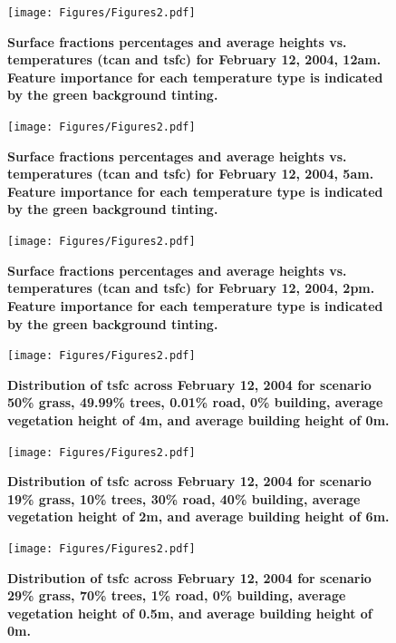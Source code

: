 \documentclass[final,3p,times,authoryear]{elsarticle}
\begin{document}
\begin{figure}
\centering
\texttt{[image: Figures/Figures2.pdf]}
\caption{\bf Surface fractions percentages and average heights vs. temperatures (\gls{tcan} and \gls{tsfc}) for February 12, 2004, 12am. Feature importance for each temperature type is indicated by the green background tinting.}
 \label{fig:box0a}
\end{figure} 

\begin{figure}
\centering
\texttt{[image: Figures/Figures2.pdf]}
\caption{\bf Surface fractions percentages and average heights vs. temperatures (\gls{tcan} and \gls{tsfc}) for February 12, 2004, 5am. Feature importance for each temperature type is indicated by the green background tinting.}
 \label{fig:box5a}
\end{figure} 

\begin{figure}
\centering
\texttt{[image: Figures/Figures2.pdf]}
\caption{\bf Surface fractions percentages and average heights vs. temperatures (\gls{tcan} and \gls{tsfc}) for February 12, 2004, 2pm. Feature importance for each temperature type is indicated by the green background tinting.}
 \label{fig:box14a}
\end{figure} 



\begin{figure}
\centering
\texttt{[image: Figures/Figures2.pdf]}
\caption{\bf Distribution of \gls{tsfc} across February 12, 2004 for scenario 50\% grass, 49.99\% trees, 0.01\% road, 0\% building, average vegetation height of 4m, and average building height of 0m.}
 \label{fig:dist1}
\end{figure}


\begin{figure}
\centering
\texttt{[image: Figures/Figures2.pdf]}
\caption{\bf Distribution of \gls{tsfc} across February 12, 2004 for scenario 19\% grass, 10\% trees, 30\% road, 40\% building, average vegetation height of 2m, and average building height of 6m.}
 \label{fig:dist2}
\end{figure}



\begin{figure}
\centering
\texttt{[image: Figures/Figures2.pdf]}
\caption{\bf Distribution of \gls{tsfc} across February 12, 2004 for scenario 29\% grass, 70\% trees, 1\% road, 0\% building, average vegetation height of 0.5m, and average building height of 0m.}
 \label{fig:dist3}
\end{figure}
\end{document}
